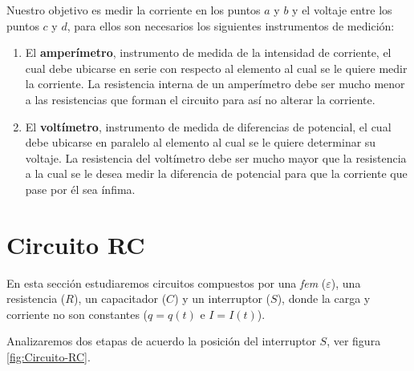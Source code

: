 Nuestro objetivo es medir la corriente en los puntos $a$ y $b$ y el voltaje entre los puntos $c$ y $d$, para ellos son necesarios los siguientes instrumentos de medición:

\begin{enumerate}
\item El \textbf{amperímetro}, instrumento de medida de la intensidad de corriente, el cual debe ubicarse en serie con respecto al elemento al cual se le quiere medir la corriente. La resistencia interna de un amperímetro debe ser mucho menor a las resistencias que forman el circuito para así no alterar la corriente.

\item El \textbf{voltímetro}, instrumento de medida de diferencias de potencial, el cual debe ubicarse en paralelo al elemento al cual se le quiere determinar su voltaje. La resistencia del voltímetro debe ser mucho mayor que la resistencia a la cual se le desea medir la diferencia de potencial para que la corriente que pase por él sea ínfima.
\end{enumerate}

\section{Circuito RC}

En esta sección estudiaremos circuitos compuestos por una \textit{fem} ($\varepsilon$), una resistencia ($R$), un capacitador ($C$) y un interruptor ($S$), donde la carga y corriente no son constantes ($q = q(t)$ e $I = I(t)$).

Analizaremos dos etapas de acuerdo la posición del interruptor $S$, ver figura \ref{fig:Circuito-RC}.

